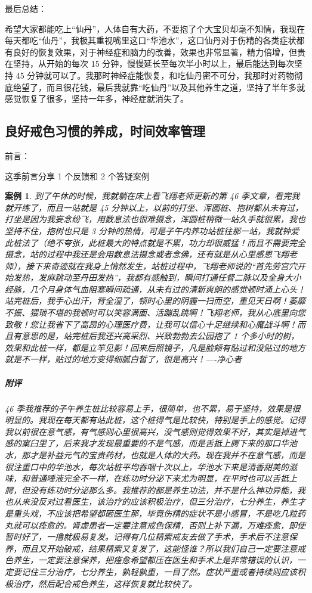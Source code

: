\documentclass[fontset=founder]{ctexart}
\newtheorem{case}{案例}
\begin{document}
最后总结：

希望大家都能吃上“仙丹”，人体自有大药，不要抱了个大宝贝却毫不知情，我现在每天都吃“仙丹”，我极其重视嘴里这口“华池水”，这口仙丹对于伤精的各类症状都有良好的恢复效果，对于神经症和脑力的改善，效果也非常显著，精力倍增，但贵在坚持，从开始的每次 15 分钟，慢慢延长至每次半小时以上，最后能达到每次坚持 45 分钟就可以了。我那时神经症能恢复，和吃仙丹密不可分，我那时对药物彻底绝望了，而且很花钱，最后我就靠“吃仙丹”以及其他养生之道，坚持了半年多就感觉恢复了很多，坚持一年多，神经症就消失了。

\subsection{良好戒色习惯的养成，时间效率管理}

前言：

这季前言分享 1 个反馈和 2 个答疑案例

\begin{case}
    到了午休的时候，我就躺在床上看飞翔老师更新的第 46 季文章，看完我就开练了，而且一站就是 45 分钟以上，以前的打坐、浑圆桩、抱树都从未有过，打坐是因为我妄念纷飞，用数息法也很难摄念，浑圆桩稍微一站久手就很累，我也坚持不住，抱树也只是 3 分钟的热情，可是子午内养功站桩往那一站，我就钟爱此桩法了（绝不夸张，此桩最大的特点就是不累，功力却很威猛！而且不需要完全摄念，站的过程中我还是会用数息法摄念或者念佛，还有就是从心里感恩飞翔老师），接下来奇迹就在我身上悄然发生，站桩过程中，飞翔老师说的“首先劳宫穴开始发热，发麻跳动至丹田发热”，我都有感触到，瞬间打通任督二脉以及全身大小经脉，几个月身体气血阻塞瞬间疏通，从未有过的清新爽朗的感觉顿时涌上心头！站完桩后，我手心出汗，背全湿了，顿时心里的阴霾一扫而空，重见天日啊！萎靡不振、猥琐不堪的我顿时可以笑容满面、活蹦乱跳啊！飞翔老师，我从心底里向您致敬！您让我省下了高昂的心理医疗费，让我可以信心十足继续和心魔战斗啊！而且有意思的是，站完桩后我还兴高采烈、兴致勃勃去公园抱了 1 个多小时的树，效果和此桩一样，都是立竿见影！回来后照镜子，凡是脸颊有贴过和没贴过的地方就是不一样，贴过的地方变得细腻白皙了，很是高兴！----净心者
    \subparagraph{附评} 46 季我推荐的子午养生桩比较容易上手，很简单，也不累，易于坚持，效果是很明显的。我现在每天都有站此桩，这个桩得气是比较快，特别是手上的感觉。记得我以前很在意气感，有气感则心里很高兴，没气感则觉得效果不好，其实是掉进气感的窠臼里了，后来我才发现最重要的不是气感，而是舌抵上腭下来的那口华池水，那才是补益元气的宝贵药材，也就是人体的大药。现在我并不在意气感，而是很注重口中的华池水，每次站桩平均吞咽十次以上，华池水下来是清香甜美的滋味，和普通唾液完全不一样，在练功时分泌下来尤为明显，在平时也可以舌抵上腭，但没有练功时分泌那么多。我推荐的都是养生功法，并不是什么神功异能，我也从来没反对过看医生，该治疗的应该积极治疗，但三分治疗，七分养生，养生才是重头戏，不应该把希望都砸医生那，毕竟伤精的症状不是小感冒，不是吃几粒药丸就可以痊愈的。肾虚患者一定要注意戒色保精，否则上补下漏，万难痊愈，即使暂时好了，一撸就极易复发。记得有几位精索戒友去做了手术，手术后不注意保养，而且又开始破戒，结果精索又复发了，这能怪谁？所以我们自己一定要注意戒色养生，一定要注意保养，把痊愈希望都压在医生和手术上是非常错误的认识，一定要记住三分治疗，七分养生，孰轻孰重，一目了然。症状严重或者持续则应该积极治疗，然后配合戒色养生，这样恢复就比较快了。
\end{case}
\end{document}
